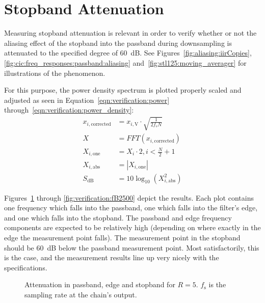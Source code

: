 \section{Stopband Attenuation} %
\label{sec:verification:snr}

Measuring stopband attenuation  is relevant in order to verify  whether or not
the aliasing effect  of the stopband into the passband  during downsampling is
attenuated to the specified degree of \SI{60}{\dB}. See
Figures~\ref{fig:aliasing:iirCopies},
\ref{fig:cic:freq_responses:passband:aliasing}
and~\ref{fig:stl125:moving_averager} for illustrations of the phenomenon.

For this purpose,  the power density spectrum is plotted
properly scaled and adjusted  as seen in Equation~\ref{eqn:verification:power}
through~\ref{eqn:verification:power_density}:
\begin{align}
    x_{i,\mathrm{corrected}} &= x_{i,\mathrm{V}} \cdot \sqrt{\frac{1}{2f_s N}} \label{eqn:verification:power} \\
    X                        &= FFT\left(x_{i,\mathrm{corrected}}\right)       \\
    X_{i,\mathrm{one}}       &= X_i \cdot 2, i < \frac{N}{2}+1                 \\
    X_{i,\mathrm{abs}}       &= |X_{i,\mathrm{one}}|                           \\
    S_{\si{\dB}}             &= 10\log_{10}(X_{i,\mathrm{abs}}^2)              \label{eqn:verification:power_density}
\end{align}

Figures~\ref{fig:verification:fB5}    through    \ref{fig:verification:fB2500}
depict  the results. Each  plot contains  one frequency  which falls  into the
passband, one which falls into the filter's edge, and one which falls into the
stopband.   The passband  and edge  frequency  components are  expected to  be
relatively high (depending on where exactly  in the edge the measurement point
falls). The measurement point in the stopband should be \SI{60}{\dB} below the
passband measurement  point. Most satisfactorily,  this is  the case,  and the
measurement results line up very nicely with the specifications.

\begin{figure}
    \centering
    
    \caption[Attenuation in Passband, Edge and Stopband for $R=5$]{%
        Attenuation in passband, edge and stopband for $R=5$.
        $f_\mathrm{s}$ is the sampling rate at the chain's output.%
    }
    \label{fig:verification:fB5}
\end{figure}

